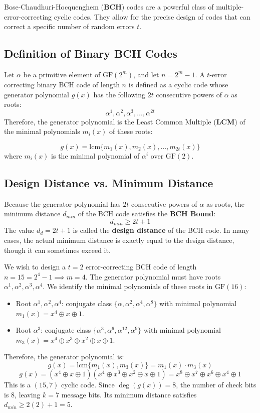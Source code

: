 \documentclass[12pt,a4paper]{article}
\begin{document}
Bose-Chaudhuri-Hocquenghem (\textbf{BCH}) codes are a powerful class of multiple-error-correcting cyclic codes. They allow for the precise design of codes that can correct a specific number of random errors $t$.

\subsection{Definition of Binary BCH Codes}
Let $\alpha$ be a primitive element of $\text{GF}(2^m)$, and let $n = 2^m-1$. A $t$-error correcting binary BCH code of length $n$ is defined as a cyclic code whose generator polynomial $g(x)$ has the following $2t$ consecutive powers of $\alpha$ as roots:
\[ \alpha^1, \alpha^2, \alpha^3, \dots, \alpha^{2t} \]
Therefore, the generator polynomial is the Least Common Multiple (\textbf{LCM}) of the minimal polynomials $m_i(x)$ of these roots:
\begin{tcolorbox}[formulabox, title={\textbf{BCH Generator Polynomial}}]
\[ g(x) = \text{lcm} \{ m_1(x), m_2(x), \dots, m_{2t}(x) \} \]
where $m_i(x)$ is the minimal polynomial of $\alpha^i$ over $\text{GF}(2)$.
\end{tcolorbox}

\subsection{Design Distance vs. Minimum Distance}
Because the generator polynomial has $2t$ consecutive powers of $\alpha$ as roots, the minimum distance $d_{min}$ of the BCH code satisfies the \textbf{BCH Bound}:
\[ d_{min} \ge 2t + 1 \]
The value $d_d = 2t + 1$ is called the \textbf{design distance} of the BCH code. In many cases, the actual minimum distance is exactly equal to the design distance, though it can sometimes exceed it.

\begin{tcolorbox}[examplebox, title={\textbf{Design of a 2-Error Correcting BCH Code of Length $n=15$}}]
We wish to design a $t=2$ error-correcting BCH code of length $n = 15 = 2^4 - 1 \implies m=4$.
The generator polynomial must have roots $\alpha^1, \alpha^2, \alpha^3, \alpha^4$.
We identify the minimal polynomials of these roots in $\text{GF}(16)$:
\begin{itemize}[leftmargin=*, itemsep=2pt]
  \item Root $\alpha^1, \alpha^2, \alpha^4$: conjugate class $\{\alpha, \alpha^2, \alpha^4, \alpha^8\}$ with minimal polynomial $m_1(x) = x^4 \oplus x \oplus 1$.
  \item Root $\alpha^3$: conjugate class $\{\alpha^3, \alpha^6, \alpha^{12}, \alpha^9\}$ with minimal polynomial $m_3(x) = x^4 \oplus x^3 \oplus x^2 \oplus x \oplus 1$.
\end{itemize}
Therefore, the generator polynomial is:
\[ g(x) = \text{lcm}\{m_1(x), m_3(x)\} = m_1(x) \cdot m_3(x) \]
\[ g(x) = (x^4 \oplus x \oplus 1)(x^4 \oplus x^3 \oplus x^2 \oplus x \oplus 1) = x^8 \oplus x^7 \oplus x^6 \oplus x^4 \oplus 1 \]
This is a $(15, 7)$ cyclic code. Since $\deg(g(x)) = 8$, the number of check bits is $8$, leaving $k = 7$ message bits. Its minimum distance satisfies $d_{min} \ge 2(2) + 1 = 5$.
\end{tcolorbox}
\end{document}

